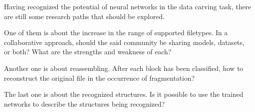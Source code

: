 Having recognized the potential of neural networks in the data carving task, there are still some research paths that should be explored.


One of them is about the increase in the range of supported filetypes. In a collaborative approach, should the said community be sharing models, datasets, or both? What are the strengths and weakness of each?

Another one is about reassembling. After each block has been classified, how to reconstruct the original file in the occurrence of fragmentation?

The last one is about the recognized structures. Is it possible to use the trained networks to describe the structures being recognized?



    
    



